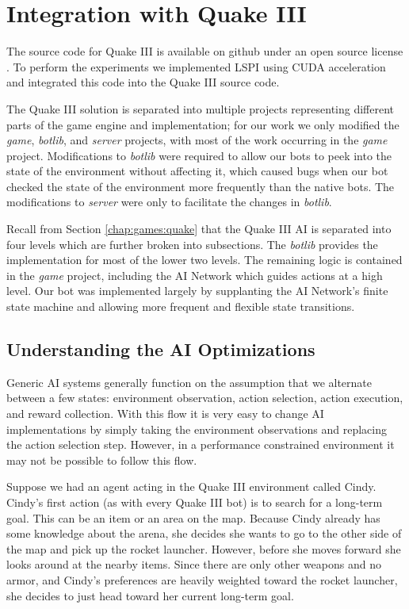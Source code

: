 \section{Integration with Quake III}

The source code for Quake III is available on github under an open source license \cite{q3code}. To perform the experiments we implemented LSPI using CUDA acceleration and integrated this code into the Quake III source code.

The Quake III solution is separated into multiple projects representing different parts of the game engine and implementation; for our work we only modified the \emph{game}, \emph{botlib}, and \emph{server} projects, with most of the work occurring in the \emph{game} project. Modifications to \emph{botlib} were required to allow our bots to peek into the state of the environment without affecting it, which caused bugs when our bot checked the state of the environment more frequently than the native bots. The modifications to \emph{server} were only to facilitate the changes in \emph{botlib}.

Recall from Section \ref{chap:games:quake} that the Quake III AI is separated into four levels which are further broken into subsections. The \emph{botlib} provides the implementation for most of the lower two levels. The remaining logic is contained in the \emph{game} project, including the AI Network which guides actions at a high level. Our bot was implemented largely by supplanting the AI Network's finite state machine and allowing more frequent and flexible state transitions.

\subsection{Understanding the AI Optimizations}

Generic AI systems generally function on the assumption that we alternate between a few states: environment observation, action selection, action execution, and reward collection. With this flow it is very easy to change AI implementations by simply taking the environment observations and replacing the action selection step. However, in a performance constrained environment it may not be possible to follow this flow.

Suppose we had an agent acting in the Quake III environment called Cindy. Cindy's first action (as with every Quake III bot) is to search for a long-term goal. This can be an item or an area on the map. Because Cindy already has some knowledge about the arena, she decides she wants to go to the other side of the map and pick up the rocket launcher. However, before she moves forward she looks around at the nearby items. Since there are only other weapons and no armor, and Cindy's preferences are heavily weighted toward the rocket launcher, she decides to just head toward her current long-term goal.

